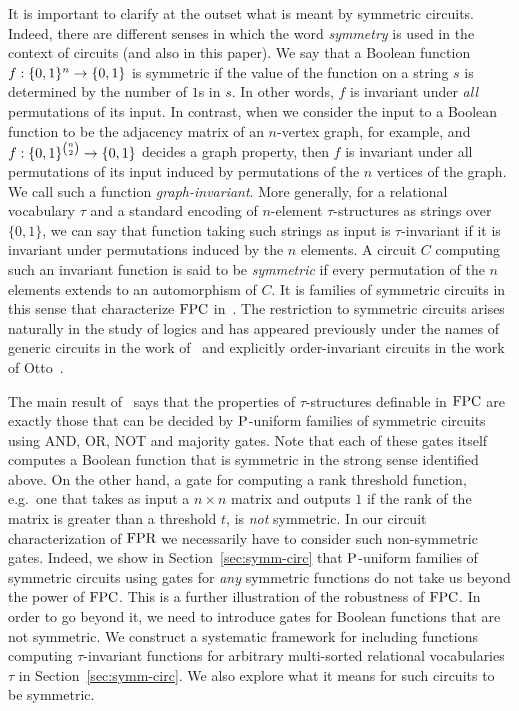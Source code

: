 \documentclass[../paper.tex]{subfiles}
\begin{document}
It is important to clarify at the outset what is meant by symmetric circuits.
Indeed, there are different senses in which the word \emph{symmetry} is used in
the context of circuits (and also in this paper). We say that a Boolean function
$f:\{0,1\}^n \rightarrow \{0,1\}$ is symmetric if the value of the function on a string
$s$ is determined by the number of $1$s in $s$. In other words, $f$ is invariant
under \emph{all} permutations of its input. In contrast, when we consider the
input to a Boolean function to be the adjacency matrix of an $n$-vertex graph,
for example, and $f : \{0,1\}^{n \choose 2} \rightarrow \{0,1\}$ decides a graph
property, then $f$ is invariant under all permutations of its input induced by
permutations of the $n$ vertices of the graph. We call such a function
\emph{graph-invariant}. More generally, for a relational vocabulary $\tau$ and a
standard encoding of $n$-element $\tau$-structures as strings over $\{0,1\}$, we
can say that function taking such strings as input is $\tau$-invariant if it is
invariant under permutations induced by the $n$ elements. A circuit $C$
computing such an invariant function is said to be \emph{symmetric} if every
permutation of the $n$ elements extends to an automorphism of $C$. It is
families of symmetric circuits in this sense that characterize $\text{\upshape FPC}$
in~\cite{AndersonD17}. The restriction to symmetric circuits arises naturally in
the study of logics and has appeared previously under the names of generic
circuits in the work of~\cite{DENENBERG1986216} and explicitly order-invariant
circuits in the work of Otto~\cite{Otto1997}.

The main result of~\cite{AndersonD17} says that the properties of
$\tau$-structures definable in $\text{\upshape FPC}$ are exactly those that can be
decided by $\mathrm{P}$-uniform families of symmetric circuits using AND, OR,
NOT and majority gates.  Note that each of these gates itself computes
a Boolean function that is symmetric in the strong sense identified
above.  On the other hand, a gate for computing a rank threshold
function, e.g.\ one that takes as input a $n \times n$ matrix and
outputs $1$ if the rank of the matrix is greater than a threshold $t$,
is \emph{not} symmetric.  In our circuit characterization of $\text{\upshape FPR}$ we
necessarily have to consider such non-symmetric gates.  Indeed, we
show in Section~\ref{sec:symm-circ} that  $\mathrm{P}$-uniform families of
symmetric circuits using gates for \emph{any} symmetric functions do
not take us beyond the power of $\text{\upshape FPC}$.  This is a further
illustration of the robustness of $\text{\upshape FPC}$.  In order to go beyond it,
we need to introduce gates for Boolean functions that are not
symmetric.  We construct a systematic framework for including
functions computing $\tau$-invariant functions for arbitrary
multi-sorted relational vocabularies $\tau$ in
Section~\ref{sec:symm-circ}.  We also explore what it means for such
circuits to be symmetric.
\end{document}
